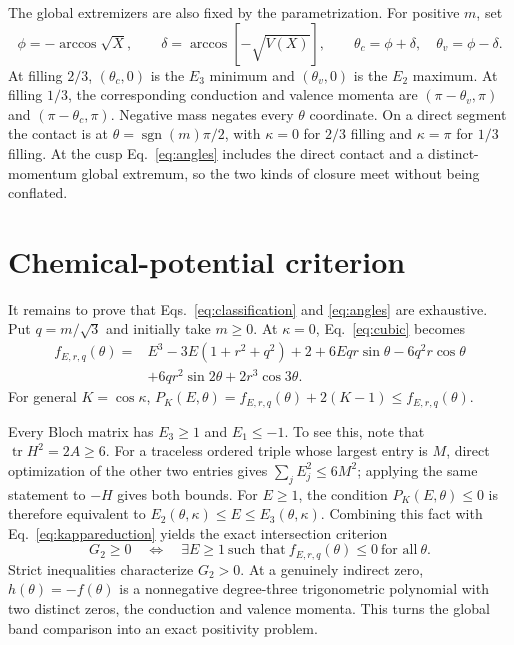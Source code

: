 \documentclass[aps,prb,preprint,superscriptaddress,nofootinbib]{revtex4-2}
\newcommand{\sgn}{\operatorname{sgn}}
\begin{document}
The global extremizers are also fixed by the parametrization.  For positive
$m$, set
\begin{equation}
\phi=-\arccos\sqrt X,\qquad
\delta=\arccos[-\sqrt{V(X)}],\qquad
\theta_c=\phi+\delta,\quad\theta_v=\phi-\delta.
\label{eq:angles}
\end{equation}
At filling $2/3$, $(\theta_c,0)$ is the $E_3$ minimum and
$(\theta_v,0)$ is the $E_2$ maximum.  At filling $1/3$, the corresponding
conduction and valence momenta are $(\pi-\theta_v,\pi)$ and
$(\pi-\theta_c,\pi)$.  Negative mass negates every $\theta$ coordinate.
On a direct segment the contact is at $\theta=\sgn(m)\pi/2$, with
$\kappa=0$ for $2/3$ filling and $\kappa=\pi$ for $1/3$ filling.  At the
cusp Eq.~\eqref{eq:angles} includes the direct contact and a distinct-momentum
global extremum, so the two kinds of closure meet without being conflated.

\section{Chemical-potential criterion}
\label{sec:criterion}

It remains to prove that Eqs.~\eqref{eq:classification} and
\eqref{eq:angles} are exhaustive.  Put $q=m/\sqrt3$ and initially take
$m\geq0$.  At $\kappa=0$, Eq.~\eqref{eq:cubic} becomes
\begin{align}
f_{E,r,q}(\theta)={}&E^3-3E(1+r^2+q^2)+2
+6Eqr\sin\theta-6q^2r\cos\theta\nonumber\\
&+6qr^2\sin2\theta+2r^3\cos3\theta.
\label{eq:f}
\end{align}
For general $K=\cos\kappa$,
$P_K(E,\theta)=f_{E,r,q}(\theta)+2(K-1)\leq f_{E,r,q}(\theta)$.

Every Bloch matrix has $E_3\geq1$ and $E_1\leq-1$.  To see this, note that
$\operatorname{tr}H^2=2A\geq6$.  For a traceless ordered triple whose largest
entry is $M$, direct optimization of the other two entries gives
$\sum_jE_j^2\leq6M^2$; applying the same statement to $-H$ gives both bounds.
For $E\geq1$, the condition $P_K(E,\theta)\leq0$ is therefore equivalent to
$E_2(\theta,\kappa)\leq E\leq E_3(\theta,\kappa)$.  Combining this fact with
Eq.~\eqref{eq:kappareduction} yields the exact intersection criterion
\begin{equation}
G_2\geq0\quad\Longleftrightarrow\quad
\exists E\geq1\ \text{such that}\ f_{E,r,q}(\theta)\leq0
\ \text{for all}\ \theta.
\label{eq:criterion}
\end{equation}
Strict inequalities characterize $G_2>0$.  At a genuinely indirect zero,
$h(\theta)=-f(\theta)$ is a nonnegative degree-three trigonometric polynomial
with two distinct zeros, the conduction and valence momenta.  This turns the
global band comparison into an exact positivity problem.
\end{document}
